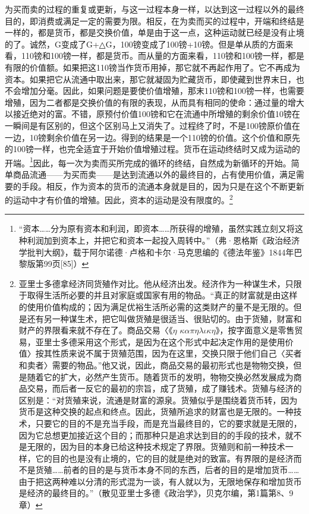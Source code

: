 \documentclass{ctexbook}
\begin{document}
    为买而卖的过程的重复或更新，与这一过程本身一样，以达到这一过程以外的最终目的，即消费或满足一定的需要为限。相反，在为卖而买的过程中，开端和终结是一样的，都是货币，都是交换价值，单是由于这一点，这种运动就已经是没有止境的了。诚然，G变成了G+△G，100镑变成了100镑+10镑。但是单从质的方面来看，110镑和100镑一样，都是货币。而从量的方面来看，110镑和100镑一样，都是有限的价值额。如果把这110镑当作货币用掉，那它就不再起作用了。它不再成为资本。如果把它从流通中取出来，那它就凝固为贮藏货币，即使藏到世界末日，也不会增加分毫。因此，如果问题是要使价值增殖，那末110镑和100镑一样，也需要增殖，因为二者都是交换价值的有限的表现，从而具有相同的使命：通过量的增大以接近绝对的富。不错，原预付价值100镑和它在流通中所增殖的剩余价值10镑在一瞬间是有区别的，但这个区别马上又消失了。过程终了时，不是100镑原价值在一边，10镑剩余价值在另一边。得到的结果是一个110镑的价值。这个价值和原先的100镑一样，也完全适宜于开始价值增殖过程。货币在运动终结时又成为运动的开端。\footnote{“资本……分为原有资本和利润，即资本……所获得的增殖，虽然实践立刻又将这种利润加到资本上，并把它和资本一起投入周转中。”（弗·恩格斯《政治经济学批判大纲》，载于阿尔诺德·卢格和卡尔·马克思编的《德法年鉴》1844年巴黎版第99页[85]）}因此，每一次为卖而买所完成的循环的终结，自然成为新循环的开始。简单商品流通——为买而卖——是达到流通以外的最终目的，占有使用价值，满足需要的手段。相反，作为资本的货币的流通本身就是目的，因为只是在这个不断更新的运动中才有价值的增殖。因此，资本的运动是没有限度的。\footnote{亚里士多德拿经济同货殖作对比。他从经济出发。经济作为一种谋生术，只限于取得生活所必要的并且对家庭或国家有用的物品。“真正的财富就是由这样的使用价值构成的；因为满足优裕生活所必需的这类财产的量不是无限的。但是还有另一种谋生术，把它叫做货殖是很适当、很贴切的。由于货殖，财富和财产的界限看来就不存在了。商品交易〈《$\eta$ $\kappa$$\alpha$$\pi$$\eta$$\lambda$$\iota$$\kappa$$\eta$》，按字面意义是零售贸易，亚里士多德采用这个形式，是因为在这个形式中起决定作用的是使用价值〉按其性质来说不属于货殖范围，因为在这里，交换只限于他们自己〈买者和卖者〉需要的物品。”他又说，因此，商品交易的最初形式也是物物交换，但是随着它的扩大，必然产生货币。随着货币的发明，物物交换必然发展成为商品交易，而后者一反它的最初的宗旨，成了货殖，成了赚钱术。货殖与经济的区别是：“对货殖来说，流通是财富的源泉。货殖似乎是围绕着货币转，因为货币是这种交换的起点和终点。因此，货殖所追求的财富也是无限的。一种技术，只要它的目的不是充当手段，而是充当最终目的，它的要求就是无限的，因为它总想更加接近这个目的；而那种只是追求达到目的的手段的技术，就不是无限的，因为目的本身已给这种技术规定了界限。货殖则和前一种技术一样，它的目的也是没有止境的，它的目的就是绝对的致富。有界限的是经济而不是货殖……前者的目的是与货币本身不同的东西，后者的目的是增加货币……由于把这两种难以分清的形式混为一谈，有人就以为，无限地保存和增加货币是经济的最终目的。”（散见亚里士多德《政治学》，贝克尔编，第1篇第8、9章）}
\end{document}
